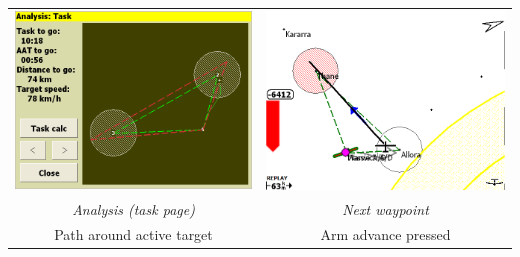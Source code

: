 \documentclass[a4paper,12pt]{refrep}
\begin{document}
\begin{maxipage}
\begin{center}
\begin{longtable}{|c|c|}
 \midrule

\includegraphics[angle=0,width=0.45\linewidth,keepaspectratio='true']{figures/faat05.png} & 
\includegraphics[angle=0,width=0.45\linewidth,keepaspectratio='true']{figures/faat06.png} \\
{\em Analysis (task page)} & {\em Next waypoint} \\
Path around active target  & Arm advance pressed \\
\bottomrule
\end{longtable}
\end{center}
\end{maxipage}
\end{document}
